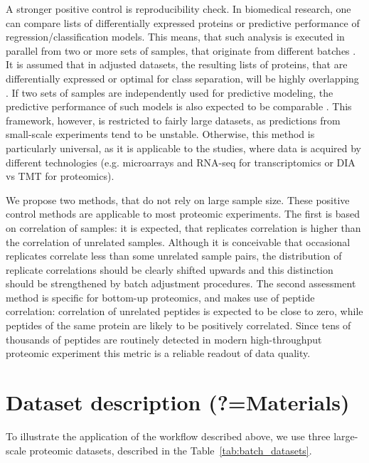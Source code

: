 \documentclass[num-refs]{wiley-article}
\begin{document}
A stronger positive control is reproducibility check. In biomedical research, one can compare lists of differentially expressed proteins or predictive performance of regression/classification models. This means, that such analysis is executed in parallel from two or more sets of samples, that originate from different batches \cite{Lazar:2013aa}. It is assumed that in adjusted datasets, the resulting lists of proteins, that are differentially expressed or optimal for class separation, will be highly overlapping \cite{Shabalin:2008aa}. If two sets of samples are independently used for predictive modeling, the predictive performance of such models is also expected to be comparable \cite{Luo2010}. This framework, however, is restricted to fairly large datasets, as predictions from small-scale experiments tend to be unstable. Otherwise, this method is particularly universal, as it is applicable to the studies, where data is acquired by different technologies (e.g. microarrays and RNA-seq for transcriptomics or DIA vs TMT for proteomics).
 
We propose two methods, that do not rely on large sample size. These positive control methods are applicable to most proteomic experiments. The first is based on correlation of samples: it is expected, that replicates correlation is higher than the correlation of unrelated samples. Although it is conceivable that occasional replicates correlate less than some unrelated sample pairs, the distribution of replicate correlations should be clearly shifted upwards and this distinction should be strengthened by batch adjustment procedures. The second assessment method is specific for bottom-up proteomics, and makes use of peptide correlation: correlation of unrelated peptides is expected to be close to zero, while peptides of the same protein are likely to be positively correlated. Since tens of thousands of peptides are routinely detected in modern high-throughput proteomic experiment this metric is a reliable readout of data quality.

\section{Dataset description (?=Materials)}\label{subsec:datasets}

To illustrate the application of the workflow described above, we use three large-scale proteomic datasets, described in the Table~\ref{tab:batch_datasets}. 
\end{document}
